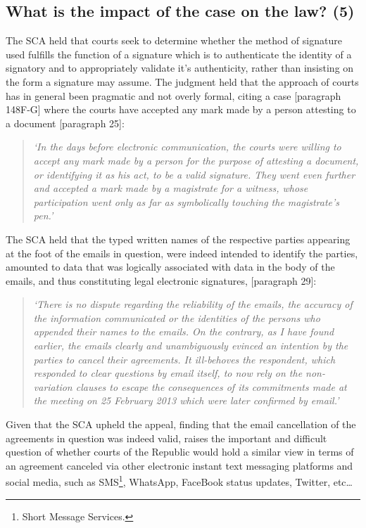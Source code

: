 \documentclass[11pt]{article}
\begin{document}
\subsection{What is the impact of the case on the law? (5)}
\label{sec:org8a9b93b}

The SCA held that courts seek to determine whether the method of signature used
fulfills the function of a signature which is to authenticate the identity of a
signatory and to appropriately validate it's authenticity, rather than insisting
on the form a signature may assume. The judgment held that the approach of
courts has in general been pragmatic and not overly formal, citing a case
[paragraph 148F-G]\cite{elec_signa63_putter_v_provincial_insurance} where
the courts have accepted any mark made by a person attesting to a document
[paragraph 25]\cite{Cachalia15_spring_forest_v_wilberry}:
\begin{quote}
\textit{`In the days before electronic communication, the courts were willing to accept any mark made by a person for the purpose of attesting a document, or identifying it as his act, to be a valid signature. They went even further and accepted a mark made by a magistrate for a witness, whose participation went only as far as symbolically touching the magistrate’s pen.'}
\end{quote}

The SCA held that the typed written names of the respective parties appearing at
the foot of the emails in question, were indeed intended to identify the
parties, amounted to data that was logically associated with data in the body of
the emails, and thus constituting legal electronic signatures, [paragraph 29]\cite{Cachalia15_spring_forest_v_wilberry}:
\begin{quote}
\textit{`There is no dispute regarding the reliability of the emails, the accuracy of the information communicated or the identities of the persons who appended their names to the emails. On the contrary, as I have found earlier, the emails clearly and unambiguously evinced an intention by the parties to cancel their agreements. It ill-behoves the respondent, which responded to clear questions by email itself, to now rely on the non-variation clauses to escape the consequences of its commitments made at the meeting on 25 February 2013 which were later confirmed by email.'}
\end{quote}

Given that the SCA upheld the appeal, finding that the email cancellation of the
agreements in question was indeed valid, raises the important and difficult
question of whether courts of the Republic would hold a similar view in terms of
an agreement canceled via other electronic instant text messaging platforms and
social media, such as SMS\footnote{Short Message Services.}, WhatsApp, FaceBook
status updates, Twitter, etc\ldots{}
\end{document}
